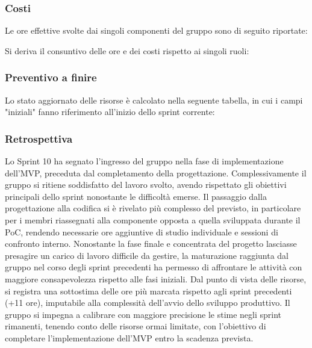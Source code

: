 \documentclass[10pt, letterpaper]{article}
\begin{document}
    \subsubsection{Costi}
    Le ore effettive svolte dai singoli componenti del gruppo sono di seguito riportate:

    \setRuoloFilippo{\Amm}
    \setRuoloChristian{\Verif}
    \setRuoloValeria{\Progr}
    \setRuoloGiuseppe{\Progr}
    \setRuoloFrancesco{\Resp}
    \setRuoloLuca{\Progr}
    \setRuoloLeonardo{\Progr}



    Si deriva il consuntivo delle ore e dei costi rispetto ai singoli ruoli:

    \subsubsection{Preventivo a finire}
    Lo stato aggiornato delle risorse è calcolato nella seguente tabella, in cui i campi "iniziali" fanno riferimento all'inizio dello sprint corrente:


    \subsubsection{Retrospettiva}
Lo Sprint 10 ha segnato l'ingresso del gruppo nella fase di implementazione dell'MVP, preceduta dal completamento della progettazione. Complessivamente il gruppo si ritiene soddisfatto del lavoro svolto, avendo rispettato gli obiettivi principali dello sprint nonostante le difficoltà emerse.
Il passaggio dalla progettazione alla codifica si è rivelato più complesso del previsto, in particolare per i membri riassegnati alla componente opposta a quella sviluppata durante il PoC, rendendo necessarie ore aggiuntive di studio individuale e sessioni di confronto interno. Nonostante la fase finale e concentrata del progetto lasciasse presagire un carico di lavoro difficile da gestire, la maturazione raggiunta dal gruppo nel corso degli sprint precedenti ha permesso di affrontare le attività con maggiore consapevolezza rispetto alle fasi iniziali.
Dal punto di vista delle risorse, si registra una sottostima delle ore più marcata rispetto agli sprint precedenti (+11 ore), imputabile alla complessità dell'avvio dello sviluppo produttivo. Il gruppo si impegna a calibrare con maggiore precisione le stime negli sprint rimanenti, tenendo conto delle risorse ormai limitate, con l'obiettivo di completare l'implementazione dell'MVP entro la scadenza prevista.
\end{document}
